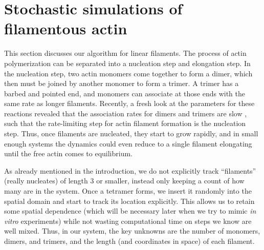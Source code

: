 \documentclass[11pt]{article}
\begin{document}
\section{Stochastic simulations of filamentous actin \label{sec:FilAct}}
This section discusses our algorithm for linear filaments. The process of actin polymerization can be separated into a nucleation step and elongation step. In the nucleation step, two actin monomers come together to form a dimer, which then must be joined by another monomer to form a trimer. A trimer has a barbed and pointed end, and monomers can associate at those ends with the same rate as longer filaments. Recently, a fresh look at the parameters for these reactions revealed that the association rates for dimers and trimers are slow \cite{rosenbloom2021mechanism}, such that the rate-limiting step for actin filament formation is the nucleation step. Thus, once filaments are nucleated, they start to grow rapidly, and in small enough systems the dynamics could even reduce to a single filament elongating until the free actin comes to equilibrium. 

As already mentioned in the introduction, we do not explicitly track ``filaments'' (really nucleates) of length 3 or smaller, instead only keeping a count of how many are in the system. Once a tetramer forms, we insert it randomly into the spatial domain and start to track its location explicitly. This allows us to retain some spatial dependence (which will be necessary later when we try to mimic \emph{in vitro} experiments) while not wasting computational time on steps we know are well mixed. Thus, in our system, the key unknowns are the number of monomers, dimers, and trimers, and the length (and coordinates in space) of each filament. 
\end{document}

